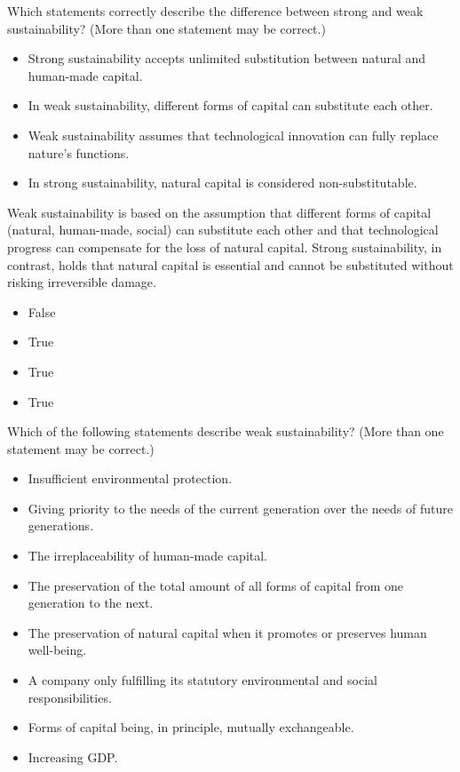 \documentclass[
  a4paper,
  DIV=11,
  numbers=noendperiod,
  oneside,
  openany]{scrreprt}
\providecommand{\tightlist}{%
  \setlength{\itemsep}{0pt}\setlength{\parskip}{0pt}}
\begin{document}
Which statements correctly describe the difference between strong and
weak sustainability? (More than one statement may be correct.)

\begin{itemize}
\tightlist
\item[$\square$]
  Strong sustainability accepts unlimited substitution between natural
  and human-made capital.
\item[$\square$]
  In weak sustainability, different forms of capital can substitute each
  other.
\item[$\square$]
  Weak sustainability assumes that technological innovation can fully
  replace nature's functions.
\item[$\square$]
  In strong sustainability, natural capital is considered
  non-substitutable.
\end{itemize}

Weak sustainability is based on the assumption that different forms of
capital (natural, human-made, social) can substitute each other and that
technological progress can compensate for the loss of natural capital.
Strong sustainability, in contrast, holds that natural capital is
essential and cannot be substituted without risking irreversible damage.

\begin{itemize}
\tightlist
\item
  False
\item
  True
\item
  True
\item
  True
\end{itemize}

Which of the following statements describe weak sustainability? (More
than one statement may be correct.)

\begin{itemize}
\tightlist
\item[$\square$]
  Insufficient environmental protection.
\item[$\square$]
  Giving priority to the needs of the current generation over the needs
  of future generations.
\item[$\square$]
  The irreplaceability of human-made capital.
\item[$\square$]
  The preservation of the total amount of all forms of capital from one
  generation to the next.
\item[$\square$]
  The preservation of natural capital when it promotes or preserves
  human well-being.
\item[$\square$]
  A company only fulfilling its statutory environmental and social
  responsibilities.
\item[$\square$]
  Forms of capital being, in principle, mutually exchangeable.
\item[$\square$]
  Increasing GDP.
\end{itemize}
\end{document}
